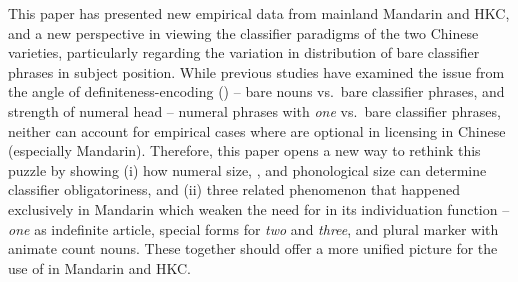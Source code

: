 \documentclass[output=paper]{langsci/langscibook}
\begin{document}
This paper has presented new empirical data from mainland Mandarin and \gls{HKC}, and a new perspective in viewing the
classifier paradigms of the two Chinese varieties, particularly
regarding the variation in distribution of bare classifier phrases in subject
position. While previous studies have examined the issue from the angle of
definiteness-encoding (\citealt{ChengSybesma1999}) -- bare nouns vs.\ bare
classifier phrases, and strength of numeral head
\citep{Huang2015} -- numeral phrases with \emph{one} vs.\ bare classifier
phrases, neither can account for empirical cases where  are
optional in licensing  in Chinese (especially Mandarin). Therefore,
this paper opens a new way to rethink this puzzle by showing (i) how numeral
size, , and phonological size can determine classifier
obligatoriness, and (ii) three related phenomenon that happened exclusively in
Mandarin which weaken the need for  in
its individuation function -- \emph{one} as indefinite article, special forms
for \emph{two} and \emph{three}, and plural marker with animate count nouns.
These together should offer a more unified picture for the use of
 in Mandarin and \gls{HKC}.

\printchapterglossary{}

{\sloppy
\printbibliography[heading=subbibliography,notkeyword=this]
}
\end{document}
